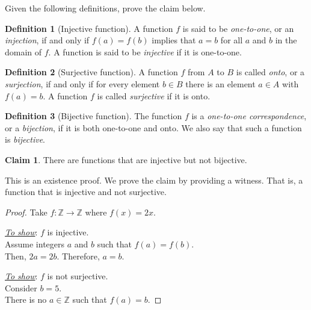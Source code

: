 \documentclass[addpoints]{exam}
\theoremstyle{definition}
\newtheorem{definition}{Definition}[section]
\theoremstyle{claim}
\newtheorem{claim}{Claim}
\newcommand\Z{\ensuremath{\mathbb{Z}}}
\begin{document}
\begin{questions}
\question[10] Given the following definitions, prove the claim below.

  \begin{definition}[Injective function]
    A function $f$ is said to be \textit{one-to-one}, or an \textit{injection}, if and only if $f (a) = f (b)$ implies that $a = b$ for all $a$ and $b$ in the domain of $f$. A function is said to be \textit{injective} if it is one-to-one.
  \end{definition}

  \begin{definition}[Surjective function]
    A function $f$ from $A$ to $B$ is called \textit{onto}, or a \textit{surjection}, if and only if for every element $b \in B$ there is an element $a \in A$ with $f(a) = b$. A function $f$ is called \textit{surjective} if it is onto.
  \end{definition}

  \begin{definition}[Bijective function]
    The function $f$ is a \textit{one-to-one correspondence}, or a \textit{bijection}, if it is both one-to-one and onto. We also say that such a function is \textit{bijective}.
  \end{definition}

  \begin{claim}
    There are functions that are injective but not bijective.
  \end{claim}

  \begin{solution}
    This is an existence proof. We prove the claim by providing a witness. That is, a function that is injective and not surjective.
    \begin{proof}
      Take $f:\Z\to\Z$ where $f(x)=2x$.

      \underline{\textit{To show}}: $f$ is injective.\\
      Assume integers $a$ and $b$ such that $f(a) = f(b)$.\\
      Then, $2a=2b$. Therefore, $a=b$.

      \underline{\textit{To show}}: $f$ is not surjective.\\
      Consider $b=5$.\\
      There is no $a\in\Z$ such that $f(a)=b$.
    \end{proof}
  \end{solution}

\end{questions}
\end{document}
